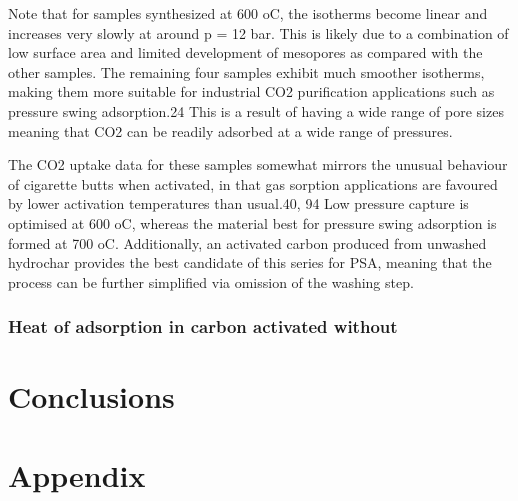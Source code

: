 Note that for samples synthesized at 600 oC, the isotherms become linear and increases very slowly at around p = 12 bar. This is likely due to a combination of low surface area and limited development of mesopores as compared with the other samples. The remaining four samples exhibit much smoother isotherms, making them more suitable for industrial CO2 purification applications such as pressure swing adsorption.24 This is a result of having a wide range of pore sizes meaning that CO2 can be readily adsorbed at a wide range of pressures.

The CO2 uptake data for these samples somewhat mirrors the unusual behaviour of cigarette butts when activated, in that gas sorption applications are favoured by lower activation temperatures than usual.40, 94 Low pressure capture is optimised at 600 oC, whereas the material best for pressure swing adsorption is formed at 700 oC. Additionally, an activated carbon produced from unwashed hydrochar provides the best candidate of this series for PSA, meaning that the process can be further simplified via omission of the washing step.


\subsubsection{Heat of adsorption in carbon activated without }
\label{sss:cb_deltaH}

\section{Conclusions}




\section*{Appendix}